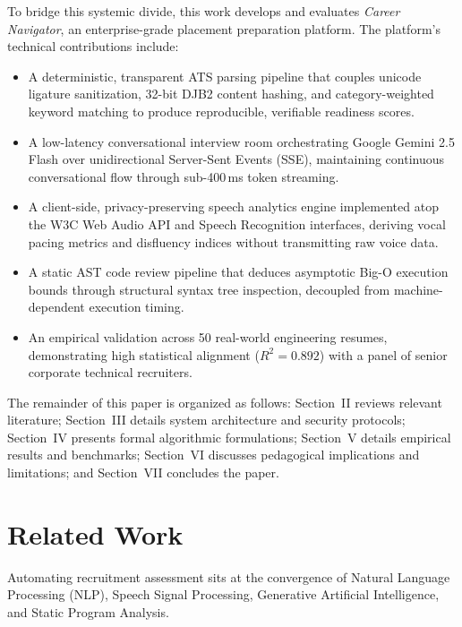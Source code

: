 \documentclass[conference]{IEEEtran}
\begin{document}
To bridge this systemic divide, this work develops and evaluates \textit{Career Navigator}, an enterprise-grade placement preparation platform. The platform's technical contributions include:
\begin{itemize}
    \item A deterministic, transparent ATS parsing pipeline that couples unicode ligature sanitization, 32-bit DJB2 content hashing, and category-weighted keyword matching to produce reproducible, verifiable readiness scores.
    \item A low-latency conversational interview room orchestrating Google Gemini 2.5 Flash over unidirectional Server-Sent Events (SSE), maintaining continuous conversational flow through sub-400\,ms token streaming.
    \item A client-side, privacy-preserving speech analytics engine implemented atop the W3C Web Audio API and Speech Recognition interfaces, deriving vocal pacing metrics and disfluency indices without transmitting raw voice data.
    \item A static AST code review pipeline that deduces asymptotic Big-O execution bounds through structural syntax tree inspection, decoupled from machine-dependent execution timing.
    \item An empirical validation across 50 real-world engineering resumes, demonstrating high statistical alignment ($R^2 = 0.892$) with a panel of senior corporate technical recruiters.
\end{itemize}

The remainder of this paper is organized as follows: Section~II reviews relevant literature; Section~III details system architecture and security protocols; Section~IV presents formal algorithmic formulations; Section~V details empirical results and benchmarks; Section~VI discusses pedagogical implications and limitations; and Section~VII concludes the paper.

\section{Related Work}
Automating recruitment assessment sits at the convergence of Natural Language Processing (NLP), Speech Signal Processing, Generative Artificial Intelligence, and Static Program Analysis.
\end{document}
